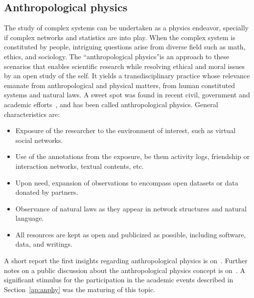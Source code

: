 \begin{apendicesenv}
\section{Anthropological physics}
The study of complex systems can be undertaken as a physics endeavor,
specially if complex networks and statistics are into play. When the complex
system is constituted by people, intriguing questions arise from diverse field such as math, ethics, and sociology. The “anthropological physics”is an approach to these scenarios that enables scientific research while resolving ethical and moral issues by an open study of the self.
	It yields a transdisciplinary practice whose relevance emanate from anthropological
and physical matters, from human constituted systems and natural laws.
A sweet spot was found in recent civil, government and academic efforts~\cite{opa,ensaio}, and has been called anthropological physics. General characteristics are:
\begin{itemize}
	\item Exposure of the researcher to the environment of interest, such as virtual social networks.
	\item Use of the annotations from the exposure, be them activity logs, friendship or interaction networks, textual contents, etc.
	\item Upon need, expansion of observations to encompass open datasets or data donated by partners.
	\item Observance of natural laws as they appear in network structures and natural language.
	\item All resources are kept as open and publicized as possible, including software, data, and writings.
\end{itemize}                                                                                                                                     
A short report the first insights regarding anthropological physics is on~\cite{anPhy}.
Further notes on a public discussion about the anthropological physics concept is on~\cite{anPhy2}.
A significant stimulus for the participation in the academic events described in Section~\ref{ap:anphy}
was the maturing of this topic.


\end{apendicesenv}
